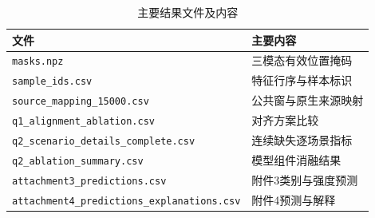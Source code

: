 \begin{table}[!htbp]\centering\normalsize
\caption{主要结果文件及内容}\label{tab:app_files_results}
\begin{tabularx}{\textwidth}{@{}p{6.6cm}>{\raggedright\arraybackslash}X@{}}
\toprule 文件 & 主要内容\\\midrule
\nolinkurl{masks.npz} & 三模态有效位置掩码\\
\nolinkurl{sample_ids.csv} & 特征行序与样本标识\\
\nolinkurl{source_mapping_15000.csv} & 公共窗与原生来源映射\\
\nolinkurl{q1_alignment_ablation.csv} & 对齐方案比较\\
\nolinkurl{q2_scenario_details_complete.csv} & 连续缺失逐场景指标\\
\nolinkurl{q2_ablation_summary.csv} & 模型组件消融结果\\
\nolinkurl{attachment3_predictions.csv} & 附件3类别与强度预测\\
\nolinkurl{attachment4_predictions_explanations.csv} & 附件4预测与解释\\
\bottomrule\end{tabularx}\end{table}

\FloatBarrier
\endgroup
